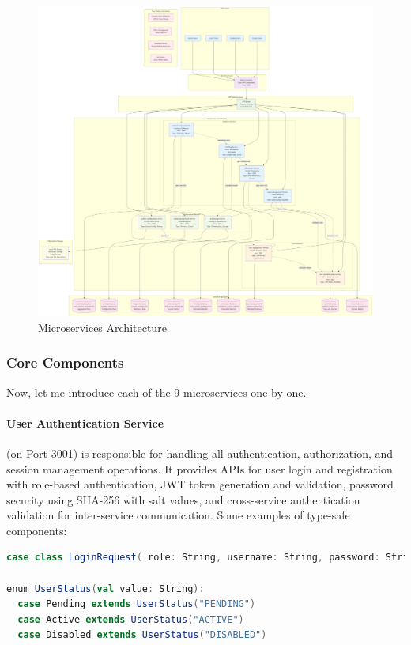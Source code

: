 \documentclass[12pt]{article}
\begin{document}
\begin{figure}[H]
    \centering
    \includegraphics[width=\textwidth]{Fig2.png}
    \caption{Microservices Architecture}
    \label{fig:ArchitectureOverview}
\end{figure}

\subsubsection{Core Components}

Now, let me introduce each of the 9 microservices one by one.

\paragraph{User Authentication Service} (on Port 3001) is responsible for handling all authentication, authorization, and session management operations. It provides APIs for user login and registration with role-based authentication, JWT token generation and validation, password security using SHA-256 with salt values, and cross-service authentication validation for inter-service communication. Some examples of type-safe components:

\begin{lstlisting}[language=Scala]
case class LoginRequest( role: String, username: String, password: String )

enum UserStatus(val value: String):
  case Pending extends UserStatus("PENDING")
  case Active extends UserStatus("ACTIVE")
  case Disabled extends UserStatus("DISABLED")
\end{lstlisting}
\end{document}
